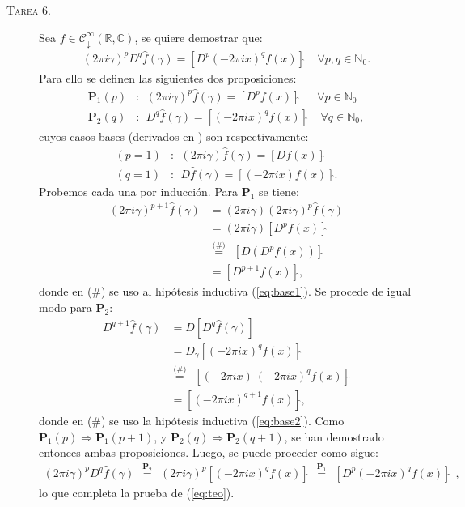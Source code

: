 \documentclass[spanish, fleqn]{article}
\begin{document}
\begin{description}
	\item[\textsc{Tarea 6.}] Sea $f \in \mathcal{C}_{\downarrow}^\infty(\mathbb{R},\mathbb{C})$, se quiere demostrar que:
	\begin{align}
		(2 \pi i \gamma)^p D^q \widehat{f}(\gamma) = \left[D^p (-2 \pi i x)^q f(x)\right]\widehat{} \ \ \ \ \ \forall p,q \in \mathbb{N}_0.
	\label{eq:teo}
	\end{align}
	Para ello se definen las siguientes dos proposiciones:
	\begin{align*}
		\mathbf{P}_1(p) &: \ \ (2 \pi i \gamma)^p \widehat{f}(\gamma) = \left[D^p f(x) \right]\widehat{} \ \ \ \ \ \ \ \forall p \in \mathbb{N}_0 \\
		\mathbf{P}_2(q) &: \ \ D^q \widehat{f}(\gamma) = [(-2 \pi i x)^q f(x)]\widehat{} \ \ \ \ \ \forall q \in \mathbb{N}_0,
	\end{align*}
	cuyos casos bases (derivados en \cite{DymMcKean}) son respectivamente:
	\begin{align}
		(p=1) &: \ \ (2 \pi i \gamma) \widehat{f}(\gamma) = \left[ D f(x) \right]\widehat{} \label{eq:base1} \\
		(q=1) &: \ \ D \widehat{f}(\gamma) =  \left[ (-2 \pi i x) f(x) \right]\widehat{} \label{eq:base2}.
	\end{align}
	Probemos cada una por inducción. Para $\mathbf{P}_1$ se tiene:
	\begin{align*}
		(2 \pi i \gamma)^{p+1} \widehat{f}(\gamma) &= (2 \pi i \gamma)(2 \pi i \gamma)^{p} \widehat{f}(\gamma) \\
		&= (2 \pi i \gamma) \left[ D^p f(x) \right]\widehat{} \\
		&\stackrel{\text{(\#)}}{=} \ \ \left[ D(D^p f(x)) \right]\widehat{} \\
		& = \left[ D^{p+1} f(x) \right]\widehat{},
	\end{align*}
	donde en (\#) se uso al hipótesis inductiva (\ref{eq:base1}). Se procede de igual modo para $\mathbf{P}_2$:
	\begin{align*}
		D^{q+1} \widehat{f}(\gamma) &= D\left[D^{q} \widehat{f}(\gamma)\right] \\
		&= D_{\gamma} \left[(-2 \pi i x)^q f(x) \right]\widehat{} \\
		&\stackrel{\text{(\#)}}{=} \ \ \left[(-2 \pi i x)\ (-2 \pi i x)^q f(x) \right]\widehat{} \\
		&= \left[(-2 \pi i x)^{q+1} f(x) \right]\widehat{},
	\end{align*}
	donde en (\#) se uso la hipótesis inductiva (\ref{eq:base2}). Como $\mathbf{P}_1(p)\Rightarrow \mathbf{P}_1(p+1)$,
	y $\mathbf{P}_2(q) \Rightarrow \mathbf{P}_2(q+1)$, se han demostrado entonces ambas proposiciones. Luego, se puede proceder como sigue:
	\begin{align*}
		(2 \pi i \gamma)^p D^q \widehat{f}(\gamma) \ \ \stackrel{\mathbf{P}_2}{=} \ \ (2 \pi i \gamma)^p \left[ (-2 \pi i x)^q f(x) \right]\widehat{} \ \ \stackrel{\mathbf{P}_1}{=} \ \ \left[ D^p (-2 \pi i x)^q f(x) \right]\widehat{}\ \ ,
	\end{align*}
	lo que completa la prueba de (\ref{eq:teo}).


\end{description}
\end{document}
